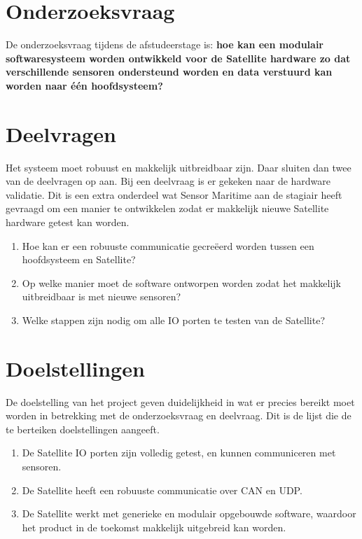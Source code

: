 \section{Onderzoeksvraag}
De onderzoeksvraag tijdens de afstudeerstage is: \textbf{hoe kan een modulair softwaresysteem worden ontwikkeld voor de Satellite hardware zo dat verschillende sensoren ondersteund worden en data verstuurd kan worden naar één hoofdsysteem?}

\section{Deelvragen}
Het systeem moet robuust en makkelijk uitbreidbaar zijn. Daar sluiten dan twee van de deelvragen op aan. Bij een deelvraag is er gekeken naar de hardware validatie. Dit is een extra onderdeel wat Sensor Maritime aan de stagiair heeft gevraagd om een manier te ontwikkelen zodat er makkelijk nieuwe Satellite hardware getest kan worden.
\begin{enumerate}
	\item Hoe kan er een robuuste  communicatie gecreëerd worden tussen een hoofdsysteem en Satellite?
	\item Op welke manier moet de software ontworpen worden zodat het makkelijk uitbreidbaar is met nieuwe sensoren?
	\item Welke stappen zijn nodig om alle IO porten te testen van de Satellite?
\end{enumerate}

\section{Doelstellingen}
De doelstelling van het project geven duidelijkheid in wat er precies bereikt moet worden in betrekking met de onderzoeksvraag en deelvraag. Dit is de lijst die de te berteiken doelstellingen aangeeft.
\begin{enumerate}
	\item De Satellite IO porten zijn volledig getest, en kunnen communiceren met sensoren.
	\item De Satellite heeft een robuuste communicatie over CAN en UDP. 
	\item De Satellite werkt met generieke en modulair opgebouwde software, waardoor het product in de toekomst makkelijk uitgebreid kan worden.
\end{enumerate}

\newpage
